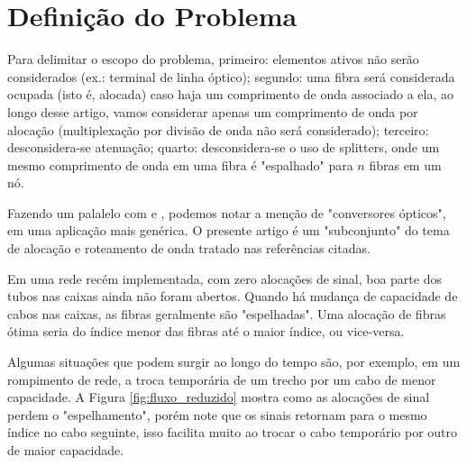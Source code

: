 \section{Definição do Problema} \label{sec:problem}

Para delimitar o escopo do problema, primeiro: elementos ativos não serão
considerados (ex.: terminal de linha óptico); segundo: uma fibra será
considerada ocupada (isto é, alocada) caso haja um comprimento de onda
associado a ela, ao longo desse artigo, vamos considerar apenas um comprimento
de onda por alocação (multiplexação por divisão de onda não será considerado);
terceiro: desconsidera-se atenuação; quarto: desconsidera-se o uso de
splitters, onde um mesmo comprimento de onda em uma fibra é "espalhado" para
$n$ fibras em um nó.

Fazendo um palalelo com \cite{artigorwa} e \cite{zang2000review}, podemos notar
a menção de "conversores ópticos", em uma aplicação mais genérica. O presente
artigo é um "subconjunto" do tema de alocação e roteamento de onda tratado nas
referências citadas.

Em uma rede recém implementada, com zero alocações de sinal, boa parte dos tubos 
nas caixas ainda não foram abertos. Quando há mudança de capacidade de cabos nas
caixas, as fibras geralmente são "espelhadas". Uma alocação de fibras ótima
seria do índice menor das fibras até o maior índice, ou vice-versa.

Algumas situações que podem surgir ao longo do tempo são, por exemplo, em um
rompimento de rede, a troca temporária de um trecho por um cabo de menor 
capacidade. A Figura \ref{fig:fluxo_reduzido} mostra como as alocações de sinal
perdem o "espelhamento", porém note que os sinais retornam para o mesmo índice
no cabo seguinte, isso facilita muito ao trocar o cabo temporário por outro de
maior capacidade.

